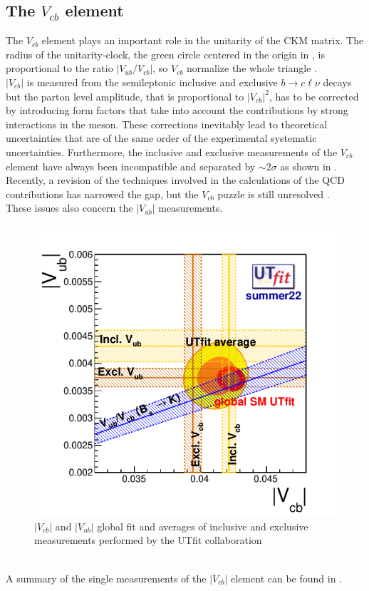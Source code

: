 \subsection{The $V_{cb}$ element}
The $V_{cb}$ element plays an important role in the unitarity of the CKM matrix. The radius of the unitarity-clock, the green circle centered in the origin in , is proportional to the ratio $|V_{ub}/V_{cb}|$, so $V_{cb}$ normalize the whole triangle \cite{Ricciardi2019DeterminationV_cb}.\\
$|V_{cb}|$ is measured from the semileptonic inclusive and exclusive $b \to c\ell\nu$
decays but the parton level amplitude, that is proportional to $|V_{cb}|^2$, has to be corrected by introducing form factors that take into account the contributions by strong interactions in the meson. These corrections inevitably lead to theoretical uncertainties that are of the same order of the experimental systematic uncertainties.
Furthermore, the inclusive and exclusive measurements of the $V_{cb}$ element have always been incompatible and separated by $\sim 2 \sigma$ as shown in . \\
Recently, a revision of the techniques involved in the calculations of the QCD contributions has narrowed the gap, but the $V_{cb}$ puzzle is still unresolved \cite{Bona2023NewScheme}.\\
These issues also concern the $|V_{ub}|$ measurements.
\\
\begin{figure}[h]
    \vspace{-1cm}
    \centering
    \includegraphics[width=0.7\linewidth]{fig//chap02-theory/vubvcb.png}
    \caption{$|V_{cb}|$ and $|V_{ub}|$ global fit and averages of inclusive and exclusive measurements performed by the UTfit collaboration \cite{Bona2023NewScheme}}
    \label{fig:vcbvub}
\end{figure}
\\
A summary of the single measurements of the $|V_{cb}|$ element can be found in \cite{PDG_2022}.
